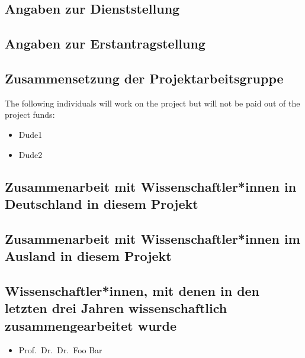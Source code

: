 \documentclass[ngerman]{scrartcl}
\begin{document}
\subsection{Angaben zur Dienststellung}

\subsection{Angaben zur Erstantragstellung}

\subsection{Zusammensetzung der Projektarbeitsgruppe}
The following individuals will work on the project but will not be paid out of
the project funds:

\begin{itemize}
\item Dude1
\item Dude2
\end{itemize}

\subsection{Zusammenarbeit mit Wissenschaftler*innen in Deutschland in diesem Projekt}

\subsection{Zusammenarbeit mit Wissenschaftler*innen im Ausland in diesem Projekt}

\subsection{Wissenschaftler*innen, mit denen in den letzten drei Jahren wissenschaftlich zusammengearbeitet wurde}
\begin{itemize}
  \item Prof.\ Dr.\ Dr.\ Foo Bar
\end{itemize}
\end{document}
